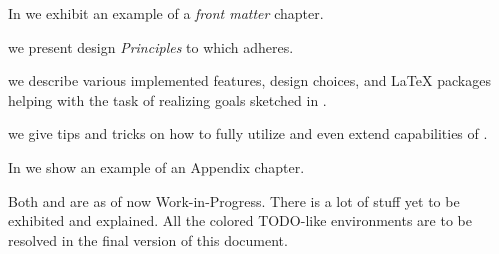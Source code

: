  \label{ch:Quick Summary}

\vspace{2ex} %


In \textbf{} we exhibit an example of a \emph{front matter} chapter.

 we present design \emph{Principles} to which \TeXtured{} adheres.

 we describe various implemented features, design choices, and \LaTeX{} packages helping with the task of realizing goals sketched in .

 we give tips and tricks on how to fully utilize and even extend capabilities of \TeXtured{}.

In \textbf{} we show an example of an Appendix chapter.

\begin{Note}
    Both  and  are as of now Work-in-Progress.
    There is a lot of stuff yet to be exhibited and explained.
    All the colored \textsf{TODO}-like environments are to be resolved in the final version of this document.
\end{Note}
